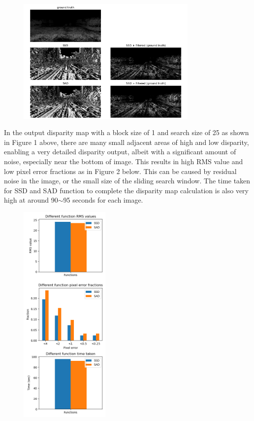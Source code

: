 \documentclass[conference]{IEEEtran}
\begin{document}
\begin{figure}[H]
    \centering
    \includegraphics[width=8.8cm]{702_output_1_25.png}
\end{figure}
In the output disparity map with a block size of 1 and search size of 25 as shown in Figure 1 above, there are many small adjacent areas of high and low disparity, enabling a very detailed disparity output, albeit with a significant amount of noise, especially near the bottom of image. This results in high RMS value and low pixel error fractions as in Figure 2 below. This can be caused by residual noise in the image, or the small size of the sliding search window. The time taken for SSD and SAD function to complete the disparity map calculation is also very high at around 90\(\sim \)95 seconds for each image.
\begin{figure}[H]
    \centering
    \includegraphics[height=11cm]{702_stats_1_25.png}
\end{figure}
\end{document}
